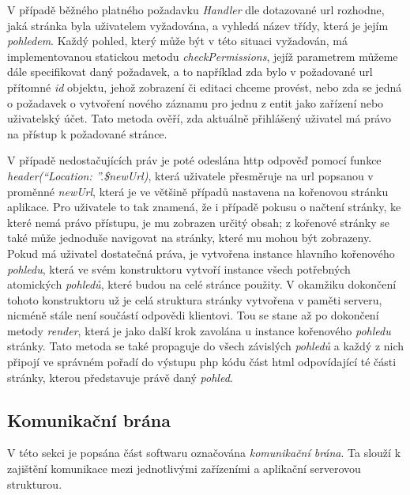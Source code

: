V případě běžného platného požadavku \emph{Handler} dle dotazované \acrshort{url} rozhodne, jaká stránka byla uživatelem vyžadována, a vyhledá název třídy, která je jejím \emph{pohledem}. Každý pohled, který může být v této situaci vyžadován, má implementovanou statickou metodu \emph{checkPermissions}, jejíž parametrem můžeme dále specifikovat daný požadavek, a to například zda bylo v požadované \acrshort{url} přítomné \emph{id} objektu, jehož zobrazení či editaci chceme provést, nebo zda se jedná o požadavek o vytvoření nového záznamu pro jednu z entit jako zařízení nebo uživatelský účet. Tato metoda ověří, zda aktuálně přihlášený uživatel má právo na přístup k požadované stránce.

V případě nedostačujících práv je poté odeslána \acrshort{http} odpověď pomocí funkce \emph{header(\enquote{Location: }.\$newUrl)}, která uživatele přesměruje na \acrshort{url} popsanou v proměnné \emph{newUrl}, která je ve většině případů nastavena na kořenovou stránku aplikace. Pro uživatele to tak znamená, že i případě pokusu o načtení stránky, ke které nemá právo přístupu, je mu zobrazen určitý obsah; z kořenové stránky se také může jednoduše navigovat na stránky, které mu mohou být zobrazeny. Pokud má uživatel dostatečná práva, je vytvořena instance hlavního kořenového \emph{pohledu}, která ve svém konstruktoru vytvoří instance všech potřebných atomických \emph{pohledů}, které budou na celé stránce použity. V okamžiku dokončení tohoto konstruktoru už je celá struktura stránky vytvořena v paměti serveru, nicméně stále není součástí odpovědi klientovi. Tou se stane až po dokončení metody \emph{render}, která je jako další krok zavolána u instance kořenového \emph{pohledu} stránky. Tato metoda se také propaguje do všech závislých \emph{pohledů} a každý z nich připojí ve správném pořadí do výstupu \acrshort{php} kódu část \acrshort{html} odpovídající té části stránky, kterou představuje právě daný \emph{pohled}. 



\subsection{Komunikační brána}

V této sekci je popsána část softwaru označována \emph{komunikační brána}. Ta slouží k zajištění komunikace mezi jednotlivými zařízeními a aplikační serverovou strukturou. 

